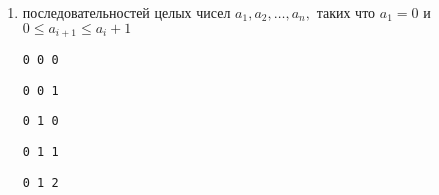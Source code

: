 \documentclass{article}
\begin{document}
\begin{enumerate}[label*=\protect\fbox{\arabic{enumi}}]
\begin{enumerate}
			\item  последовательностей целых чисел $a_1, a_2, \dotsc, a_n,$ таких
			что $a_1 = 0$ и $0 \leqslant a_{i+1} \leqslant a_i + 1$
			
			\begin{minipage}{0.18\textwidth}
				\centering
				\texttt{0 0 0}
			\end{minipage}
			\begin{minipage}{0.18\textwidth}
				\centering
				\texttt{0 0 1}
			\end{minipage}
			\begin{minipage}{0.18\textwidth}
				\centering
				\texttt{0 1 0}
			\end{minipage}
			\begin{minipage}{0.18\textwidth}
				\centering
				\texttt{0 1 1}
			\end{minipage}
			\begin{minipage}{0.18\textwidth}
				\centering
				\texttt{0 1 2}
			\end{minipage}
		\end{enumerate}
	\end{enumerate}

	
\end{document}
